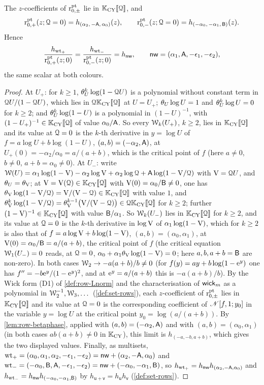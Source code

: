 \begin{lem}[Normalisation constants at $\cQ=0$]
\label{lem:ide-norm}
The $z$-coefficients of $\mathrm{r}^{\mathrm{pt}}_{0,\pm}$ lie in $\mathbb{K}_{\mathrm{CY}}[\![ \mathcal{Q} ]\!]$, and
\[
\mathrm{r}^{\mathrm{pt}}_{0,+}(z;\mathcal{Q}=0)=h_{(\alpha_2,\,-\mathsf{A},\,\alpha_0)}(z),\qquad
\mathrm{r}^{\mathrm{pt}}_{0,-}(z;\mathcal{Q}=0)=h_{(-\alpha_0,\,-\alpha_1,\,\mathsf{B})}(z).
\]
Hence
\[
\frac{h_{\mathrm{wt}_+}}{\mathrm{r}^{\mathrm{pt}}_{0,+}(z;0)}=\frac{h_{\mathrm{wt}_-}}{\mathrm{r}^{\mathrm{pt}}_{0,-}(z;0)}=h_{\mathsf{nw}},\qquad\mathsf{nw}=(\alpha_1,\mathsf{A},-\epsilon_1,-\epsilon_2),
\]
the same scalar at both colours.
\end{lem}
\begin{proof}
At $U_+$: for $k\geq 1$, $\theta_{U}^k\log(1-\mathcal{Q} U)$ is a polynomial without constant term in $\mathcal{Q} U/(1-\mathcal{Q} U)$, which lies in $\mathcal{Q}\mathbb{K}_{\mathrm{CY}}[\![ \mathcal{Q} ]\!]$ at $U=U_+$; $\theta_{U}\log U=1$ and $\theta_{U}^k\log U=0$ for $k\geq 2$; and $\theta_{U}^k\log(1-U)$ is a polynomial in $(1-U)^{-1}$, with $(1-U_+)^{-1}\in\mathbb{K}_{\mathrm{CY}}[\![ \mathcal{Q} ]\!]$ of value $\alpha_0/\mathsf{A}$. So every $\mathcal{W}_k(U_+)$, $k\geq 2$, lies in $\mathbb{K}_{\mathrm{CY}}[\![ \mathcal{Q} ]\!]$ and its value at $\cQ=0$ is the $k$-th derivative in $y=\log U$ of $f=a\log U+b\log(1-U)$, $(a,b)=(-\alpha_2,\mathsf{A})$, at $U_+(0)=-\alpha_2/\alpha_0=a/(a+b)$, which is the critical point of $f$ (here $a\neq 0$, $b\neq 0$, $a+b=\alpha_0\neq 0$). At $U_-$: write $\mathcal{W}(U)=\alpha_1\log(1-\mathrm{V})-\alpha_2\log\mathrm{V}+\alpha_2\log\mathcal{Q}+\mathsf{A}\log(1-\mathrm{V}/\mathcal{Q})$ with $\mathrm{V}=\mathcal{Q} U$, and $\theta_{U}=\theta_{\mathrm{V}}$; at $\mathrm{V}=\mathrm{V}(\mathcal{Q})\in\mathbb{K}_{\mathrm{CY}}[\![ \mathcal{Q} ]\!]$ with $\mathrm{V}(0)=\alpha_0/\mathsf{B}\neq 0$, one has $\theta_{\mathrm{V}}\log(1-\mathrm{V}/\mathcal{Q})=\mathrm{V}/(\mathrm{V}-\mathcal{Q})\in\mathbb{K}_{\mathrm{CY}}[\![ \mathcal{Q} ]\!]$ with value $1$, and $\theta_{\mathrm{V}}^{k}\log(1-\mathrm{V}/\mathcal{Q})=\theta_{\mathrm{V}}^{k-1}\big(\mathrm{V}/(\mathrm{V}-\mathcal{Q})\big)\in\mathcal{Q}\mathbb{K}_{\mathrm{CY}}[\![ \mathcal{Q} ]\!]$ for $k\geq 2$; further $(1-\mathrm{V})^{-1}\in\mathbb{K}_{\mathrm{CY}}[\![ \mathcal{Q} ]\!]$ with value $\mathsf{B}/\alpha_1$. So $\mathcal{W}_k(U_-)$ lies in $\mathbb{K}_{\mathrm{CY}}[\![ \mathcal{Q} ]\!]$ for $k\geq 2$, and its value at $\cQ=0$ is the $k$-th derivative in $\log\mathrm{V}$ of $\alpha_1\log(1-\mathrm{V})$, which for $k\geq 2$ is also that of $f=a\log\mathrm{V}+b\log(1-\mathrm{V})$, $(a,b)=(\alpha_0,\alpha_1)$, at $\mathrm{V}(0)=\alpha_0/\mathsf{B}=a/(a+b)$, the critical point of $f$ (the critical equation $\mathcal{W}_1(U_-)=0$ reads, at $\cQ=0$, $\alpha_0+\alpha_1\theta_{\mathrm{V}}\log(1-\mathrm{V})=0$; here $a,b,a+b=\mathsf{B}$ are non-zero). In both cases $\mathcal{W}_2\to-a(a+b)/b\neq 0$ (for $f(y)=ay+b\log(1-\mathrm{e}^y)$ one has $f''=-b\mathrm{e}^y/(1-\mathrm{e}^y)^2$, and at $\mathrm{e}^y=a/(a+b)$ this is $-a(a+b)/b$). By the Wick form (D1) of \cref{def:row-Lnorm} and the characterisation of $\mathsf{wick}_m$ as a polynomial in $\mathcal{W}_2^{-1},\mathcal{W}_3,\dots$ (\cref{def:set-rows}), each $z$-coefficient of $\mathrm{r}^{\mathrm{pt}}_{0,\pm}$ lies in $\mathbb{K}_{\mathrm{CY}}[\![ \mathcal{Q} ]\!]$ and its value at $\cQ=0$ is the corresponding coefficient of $\mathscr{N}[f,1;y_0]$ in the variable $y=\log U$ at the critical point $y_0=\log(a/(a+b))$. By \cref{lem:row-betaphase}, applied with $(a,b)=(-\alpha_2,\mathsf{A})$ and with $(a,b)=(\alpha_0,\alpha_1)$ (in both cases $ab(a+b)\neq 0$ in $\mathbb{K}_{\mathrm{CY}}$), this limit is $h_{(-a,-b,a+b)}$, which gives the two displayed values. Finally, as multisets, $\mathrm{wt}_+=(\alpha_0,\alpha_1,\alpha_2,-\epsilon_1,-\epsilon_2)=\mathsf{nw}+(\alpha_2,-\mathsf{A},\alpha_0)$ and $\mathrm{wt}_-=(-\alpha_0,\mathsf{B},\mathsf{A},-\epsilon_1,-\epsilon_2)=\mathsf{nw}+(-\alpha_0,-\alpha_1,\mathsf{B})$, so $h_{\mathrm{wt}_+}=h_{\mathsf{nw}} h_{(\alpha_2,-\mathsf{A},\alpha_0)}$ and $h_{\mathrm{wt}_-}=h_{\mathsf{nw}} h_{(-\alpha_0,-\alpha_1,\mathsf{B})}$ by $h_{\mathsf{u}+\mathsf{v}}=h_{\mathsf{u}}h_{\mathsf{v}}$ (\cref{def:set-rows}).

\end{proof}

